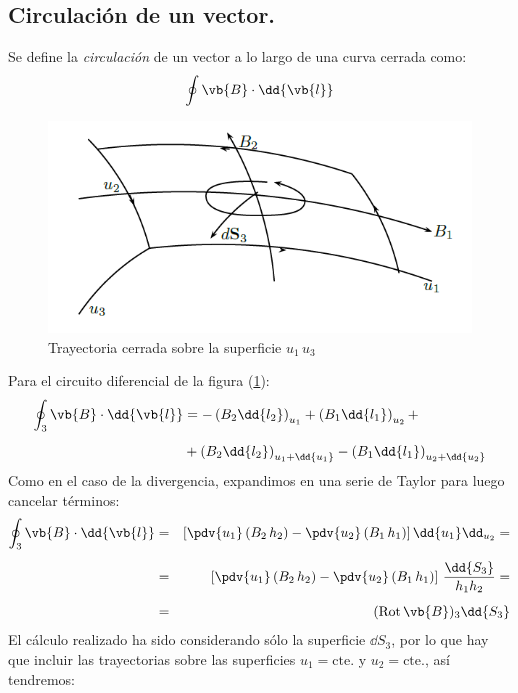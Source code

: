 \subsection{Circulación de un vector.}
Se define la \emph{circulación} de un vector a lo largo de una curva cerrada como:
\begin{align*}
\oint \vb{B} \cdot \dd{\vb{l}}
\end{align*}
\begin{figure}[H]
    \centering
    \includegraphics[scale=0.4]{Imagenes/Circulacion_Vector.png}
    \caption{Trayectoria cerrada sobre la superficie $u_{1} \, u_{3}$}
    \label{fig:figura_trayectoria_cerrada}
\end{figure}
Para el circuito diferencial de la figura (\ref{fig:figura_trayectoria_cerrada}):
\begin{align*}
\oint_{3} \vb{B} \cdot \dd{\vb{l}} &= - \left( B_{2} \dd{l_{2}} \right)_{u_{1}} + \left( B_{1} \dd{l_{1}} \right)_{u_{2}} + \\[0.5em]
&+ \left( B_{2} \dd{l_{2}} \right)_{u_{1}+\dd{u_{1}}} - \left( B_{1} \dd{l_{1}} \right)_{u_{2}+\dd{u_{2}}}
\end{align*}
Como en el caso de la divergencia, expandimos en una serie de Taylor para luego cancelar términos:
\begin{eqnarray*}
\oint_{3} \vb{B} \cdot \dd{\vb{l}} &=& \left[ \displaystyle \pdv{u_{1}} \left( B_{2} \, h_{2}\right) - \pdv{u_{2}} \left( B_{1} \, h_{1} \right) \right] \dd{u_{1}} \dd_{u_{2}} = \\[0.5em] 
&=& \left[ \pdv{u_{1}} \left( B_{2} \, h_{2}\right) - \pdv{u_{2}} \left( B_{1} \, h_{1} \right) \right] \, \dfrac{\dd{S_{3}}}{h_{1} h_{2}} = \\[0.5em] 
&=& ({\rm{Rot}} \, \vb{B})_{3} \dd{S_{3}}
\end{eqnarray*}
El cálculo realizado ha sido considerando sólo la superficie $\dd{S_{3}}$, por lo que hay que incluir las trayectorias sobre las superficies $u_{1} = \mbox{cte.}$ y $u_{2} = \mbox{cte.}$, así tendremos:
